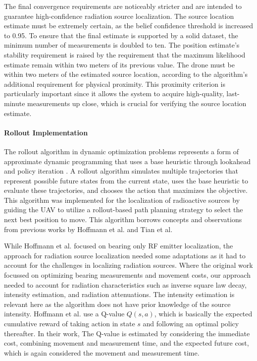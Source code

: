 \documentclass[../report.tex]{subfiles}
\begin{document}
    The final convergence requirements are noticeably stricter and are intended to guarantee high-confidence radiation source localization. The source location estimate must be extremely certain, 
    as the belief confidence threshold is increased to 0.95. To ensure that the final estimate is supported by a solid dataset, the minimum number of measurements is doubled to ten. The position 
    estimate's stability requirement is raised by the requirement that the maximum likelihood estimate remain within two meters of its previous value. The drone must be within two meters of the 
    estimated source location, according to the algorithm's additional requirement for physical proximity. This proximity criterion is particularly important since it allows the system to acquire
     high-quality, last-minute measurements up close, which is crucial for verifying the source location estimate.

    \paragraph{Rollout Implementation}
    The rollout algorithm in dynamic optimization problems represents a form of approximate dynamic programming that uses a base heuristic through lookahead and policy iteration \cite{bertsekas2013rollout}. 
    A rollout algorithm simulates multiple trajectories that represent possible future states from the current state, uses the base heuristic to evaluate these trajectories, and chooses the 
    action that maximizes the objective. This algorithm was implemented for the localization of radioactive sources by guiding the UAV to utilize a rollout-based path planning strategy to select 
    the next best position to move. This algorithm borrows concepts and observations from previous works by Hoffmann et al. \cite{rolloutHoffmann2019} and Tian et al. \cite{rolloutMultiStepLookaheadTian2008}

    While Hoffmann et al. focused on bearing only RF emitter localization, the approach for radiation source localization needed some adaptations as it had to account for the challenges in localizing 
    radiation sources. Where the original work focussed on optimizing bearing measurements and movement costs, our approach needed to account for radiation characteristics such as
    inverse square law decay, intensity estimation, and radiation attenuations. The intensity estimation is relevant here as the algorithm does not have prior knowledge of the source intensity. 
    Hoffmann et al. use a Q-value $ Q(s, a) $, which is basically the expected cumulative reward of taking action in state $s$ and following an optimal policy thereafter. In their work, 
    The Q-value is estimated by considering the immediate cost, combining movement and measurement time, and the expected future cost, which is again considered the movement and measurement time.
    
\end{document}

